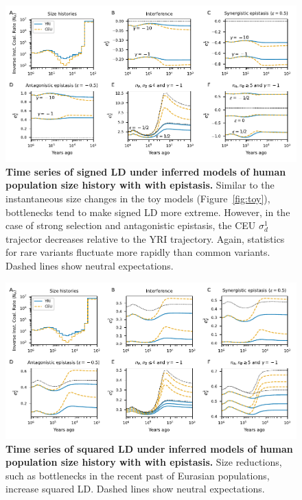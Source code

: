 \documentclass[]{article}
\begin{document}
\begin{figure}[ht!]
    \centering
    \includegraphics{../figures/demog_YRI_CEU}
    \caption{
        \textbf{Time series of signed LD under inferred models of human population
        size history with with epistasis.}
        Similar to the instantaneous size changes in the toy models
        (Figure~\ref{fig:toy}), bottlenecks tend to make signed LD more extreme.
        However, in the case of strong selection and antagonistic epistasis,
        the CEU \(\sigma_d^1\) trajector decreases relative to the YRI
        trajectory. Again, statistics for rare variants fluctuate more rapidly
        than common variants.
        Dashed lines show neutral expectations.
    }
    \label{fig:relate}
\end{figure}

\begin{figure}[ht!]
    \centering
    \includegraphics{../figures/demog_YRI_CEU.sd2}
    \caption{
        \textbf{Time series of squared LD under inferred models of human population
        size history with with epistasis.}
        Size reductions, such as bottlenecks in the recent past of Eurasian populations,
        increase squared LD.
        Dashed lines show neutral expectations.
    }
    \label{fig:relate_sd2}
\end{figure}
\end{document}
